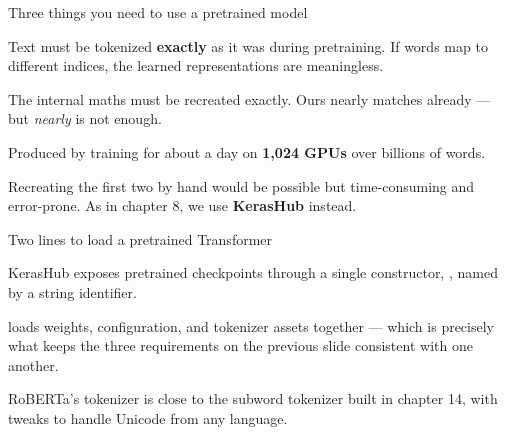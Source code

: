 \documentclass[aspectratio=169,11pt,t]{beamer}
\begin{document}
\begin{frame}[shrink=25]{Three things you need to use a pretrained model}
\begin{minipage}[t]{0.3253\textwidth}
\begin{icardaccent}
Text must be tokenized \textbf{exactly} as it was during pretraining. If words map to different indices, the learned representations are meaningless.
\end{icardaccent}
\end{minipage}%
\hfill
\begin{minipage}[t]{0.3253\textwidth}
\begin{icardaccent}
The internal maths must be recreated exactly. Ours nearly matches  already --- but \textit{nearly} is not enough.
\end{icardaccent}
\end{minipage}%
\hfill
\begin{minipage}[t]{0.3253\textwidth}
\begin{icardaccent}
Produced by training for about a day on \textbf{1,024 GPUs} over billions of words.
\end{icardaccent}
\end{minipage}%
{\fontsize{9.4}{12.6}\selectfont\color{fg2}Recreating the first two by hand would be possible but time-consuming and error-prone. As in chapter 8, we use \textbf{KerasHub} instead.\par}\vskip 4pt
\end{frame}

\begin{frame}[shrink=25]{Two lines to load a pretrained Transformer}
{\fontsize{9.4}{12.6}\selectfont\color{fg2}KerasHub exposes pretrained checkpoints through a single constructor, , named by a string identifier.\par}\vskip 4pt
{\fontsize{9.4}{12.6}\selectfont\color{fg2} loads weights, configuration, and tokenizer assets together --- which is precisely what keeps the three requirements on the previous slide consistent with one another.\par}\vskip 4pt
{\fontsize{9.4}{12.6}\selectfont\color{fg2}RoBERTa's tokenizer is close to the subword tokenizer built in chapter 14, with tweaks to handle Unicode from any language.\par}\vskip 4pt
\end{frame}
\end{document}
